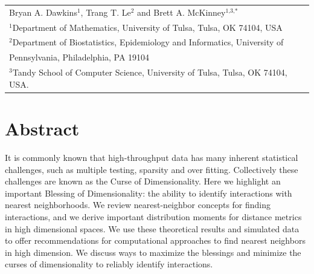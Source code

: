 \documentclass[10pt,letterpaper]{article}\usepackage[]{graphicx}\usepackage[]{color}
\begin{document}
\vspace*{0.2in}

{\Large
\textbf{} %
}
\begin{center}
  \begin{tabular}{l}
  Bryan A. Dawkins$^{\text{1}}$, Trang T. Le$^{\text{2}}$ and Brett A. McKinney$^{\text{1,3,}*}$ \\
  $^{\text{1}}$Department of Mathematics, University of Tulsa, Tulsa, OK 74104, USA \\
  $^{\text{2}}$Department of Biostatistics, Epidemiology and Informatics, University of \\
  \hphantom{2}Pennsylvania, Philadelphia, PA 19104 \\
  $^{\text{3}}$Tandy School of Computer Science, University of Tulsa, Tulsa, OK 74104, USA.
  \end{tabular}
\end{center}


\section*{Abstract}
It is commonly known that high-throughput data has many inherent statistical challenges, such as multiple testing, sparsity and over fitting. Collectively these challenges are known as the Curse of Dimensionality. Here we highlight an important Blessing of Dimensionality: the ability to identify interactions with nearest neighborhoods. We review nearest-neighbor concepts for finding interactions, and we derive important distribution moments for distance metrics in high dimensional spaces. We use these theoretical results and simulated data to offer recommendations for computational approaches to find nearest neighbors in high dimension. We discuss ways to maximize the blessings and minimize the curses of dimensionality to reliably identify interactions.  
\end{document}
